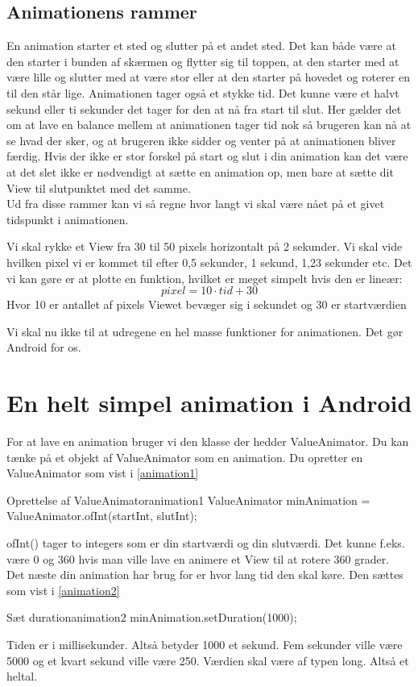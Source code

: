 \subsection{Animationens rammer}
En animation starter et sted og slutter på et andet sted. Det kan både være at den starter i bunden af skærmen og flytter sig til toppen, at den starter med at være lille og slutter med at være stor eller at den starter på hovedet og roterer en til den står lige.
Animationen tager også et stykke tid. Det kunne være et halvt sekund eller ti sekunder det tager for den at nå fra start til slut. Her gælder det om at lave en balance mellem at animationen tager tid nok så brugeren kan nå at se hvad der sker, og at brugeren ikke sidder og venter på at animationen bliver færdig. Hvis der ikke er stor forskel på start og slut i din animation kan det være at det slet ikke er nødvendigt at sætte en animation op, men bare at sætte dit View til slutpunktet med det samme.  \\
Ud fra disse rammer kan vi så regne hvor langt vi skal være nået på et givet tidspunkt i animationen. 
\begin{example}
	Vi skal rykke et View fra 30 til 50 pixels horizontalt på 2 sekunder. Vi skal vide hvilken pixel vi er kommet til efter 0,5 sekunder, 1 sekund, 1,23 sekunder etc. Det vi kan gøre er at plotte en funktion, hvilket er meget simpelt hvis den er lineær:
	\begin{equation}
	pixel=10\cdot tid+30
	\end{equation}
	Hvor 10 er antallet af pixels Viewet bevæger sig i sekundet og 30 er startværdien
\end{example}
Vi skal nu ikke til at udregene en hel masse funktioner for animationen. Det gør Android for os.
\section{En helt simpel animation i Android}
For at lave en animation bruger vi den klasse der hedder ValueAnimator. Du kan tænke på et objekt af ValueAnimator som en animation. Du opretter en ValueAnimator som vist i \autoref{animation1}
\begin{JavaCode}{Oprettelse af ValueAnimator}{animation1}
	ValueAnimator minAnimation = ValueAnimator.ofInt(startInt, slutInt);
\end{JavaCode}
ofInt() tager to integers som er din startværdi og din slutværdi. Det kunne f.eks. være 0 og 360 hvis man ville lave en animere et View til at rotere 360 grader. \\
Det næste din animation har brug for er hvor lang tid den skal køre. Den sættes som vist i \autoref{animation2}
\begin{JavaCode}{Sæt duration}{animation2}
	minAnimation.setDuration(1000);	
\end{JavaCode}
Tiden er i millisekunder. Altså betyder 1000 et sekund. Fem sekunder ville være 5000 og et kvart sekund ville være 250. Værdien skal være af typen long. Altså et heltal.
